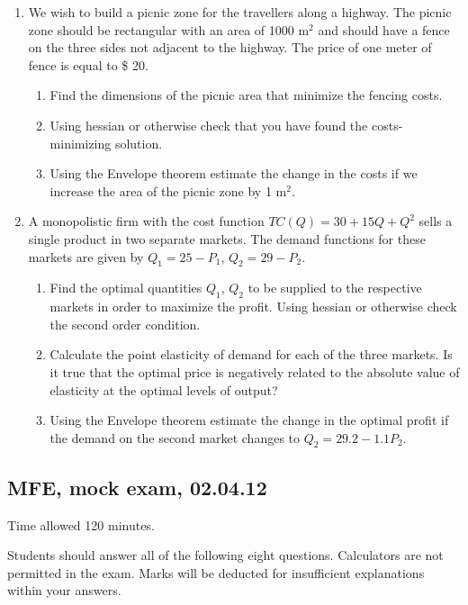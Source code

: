 \documentclass[12pt]{article} %
\theoremstyle{definition} %
\begin{document}
\begin{enumerate}
\addtocounter{enumi}{6}

\item We wish to build a picnic zone for the travellers along a highway. The picnic zone should be rectangular with an area of 1000 m$^2$ and should have a fence on the three sides not adjacent to the highway. The price of one meter of fence is equal to \$ 20.
\begin{enumerate}
\item Find the dimensions of the picnic area that minimize the fencing costs.
\item Using hessian or otherwise check that you have found the costs-minimizing solution.
\item Using the Envelope theorem estimate the change in the costs if we increase the area of the picnic zone by 1 m$^2$.
\end{enumerate}

\item A monopolistic firm with the cost function $TC(Q)=30+15Q+Q^2$ sells a single product in two separate markets. The demand functions for these markets are given by $Q_1=25-P_1$, $Q_2=29-P_2$.
\begin{enumerate}
\item Find the optimal quantities $Q_1$, $Q_2$ to be supplied to the respective markets in order to maximize the profit. Using hessian or otherwise check the second order condition.
\item Calculate the point elasticity of demand for each of the three markets. Is it true that the optimal price is negatively related to the absolute value of elasticity at the optimal levels of output?
\item Using the Envelope theorem estimate the change in the optimal profit if the demand on the second market changes to $Q_2=29.2-1.1P_2$.
\end{enumerate}


\end{enumerate}




\subsection{MFE, mock exam, 02.04.12}


Time allowed 120 minutes.

Students should answer all of the following eight questions. Calculators are not permitted in the exam. Marks will be deducted for insufficient explanations within your answers.
\end{document}
